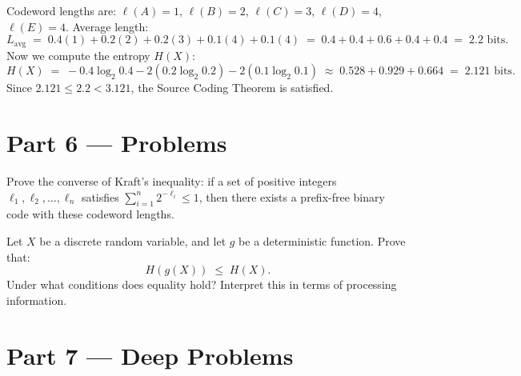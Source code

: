 Codeword lengths are: $\ell(A)=1$, $\ell(B)=2$, $\ell(C)=3$, $\ell(D)=4$, $\ell(E)=4$.
Average length:
\[
  L_{\text{avg}} \;=\; 0.4(1) + 0.2(2) + 0.2(3) + 0.1(4) + 0.1(4) \;=\; 0.4 + 0.4 + 0.6 + 0.4 + 0.4 \;=\; 2.2 \text{ bits}.
\]
Now we compute the entropy $H(X)$:
\[
  H(X) \;=\; -0.4\log_2 0.4 - 2(0.2\log_2 0.2) - 2(0.1\log_2 0.1) \;\approx\; 0.528 + 0.929 + 0.664 \;=\; 2.121 \text{ bits}.
\]
Since $2.121 \le 2.2 < 3.121$, the Source Coding Theorem is satisfied.

\bigskip

\section{Part 6 \texorpdfstring{---}{--} Problems}

\begin{problem}
Prove the converse of Kraft's inequality: if a set of positive integers $\ell_1, \ell_2, \ldots, \ell_n$ satisfies $\sum_{i=1}^n 2^{-\ell_i} \le 1$, then there exists a prefix-free binary code with these codeword lengths.
\end{problem}

\begin{problem}
Let $X$ be a discrete random variable, and let $g$ be a deterministic function. Prove that:
\[
  H(g(X)) \;\le\; H(X).
\]
Under what conditions does equality hold? Interpret this in terms of processing information.
\end{problem}

\bigskip

\section{Part 7 \texorpdfstring{---}{--} Deep Problems}

